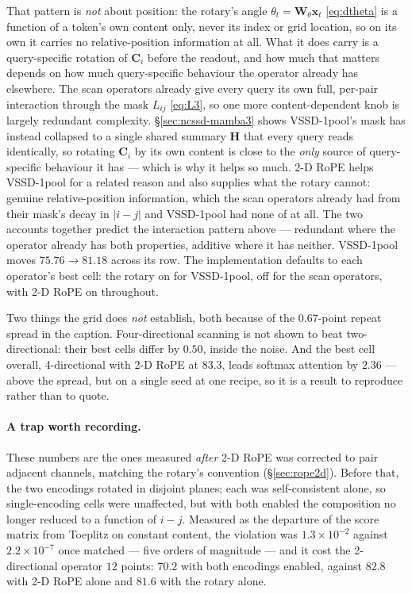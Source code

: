 \documentclass[11pt,a4paper]{article}
\begin{document}
That pattern is \emph{not} about position: the rotary's angle
$\theta_t=\bm{W}_\theta\bm{x}_t$ \eqref{eq:dtheta} is a function of a token's own
content only, never its index or grid location, so on its own it carries no
relative-position information at all. What it does carry is a query-specific rotation
of $\bm{C}_i$ before the readout, and how much that matters depends on how much
query-specific behaviour the operator already has elsewhere. The scan operators already
give every query its own full, per-pair interaction through the mask $L_{ij}$
\eqref{eq:L3}, so one more content-dependent knob is largely redundant complexity.
\S\ref{sec:ncssd-mamba3} shows VSSD-1pool's mask has instead collapsed to a single
shared summary $\bm{H}$ that every query reads identically, so rotating $\bm{C}_i$ by
its own content is close to the \emph{only} source of query-specific behaviour it has
--- which is why it helps so much. 2-D RoPE helps VSSD-1pool for a related reason and
also supplies what the rotary cannot: genuine relative-position information, which the
scan operators already had from their mask's decay in $|i-j|$ and VSSD-1pool had
none of at all. The two accounts together predict the interaction pattern above ---
redundant where the operator already has both properties, additive where it has
neither. VSSD-1pool moves $75.76 \to 81.18$ across its row. The implementation
defaults to each operator's best cell: the rotary on for VSSD-1pool, off for the
scan operators, with 2-D RoPE on throughout.

Two things the grid does \emph{not} establish, both because of the $0.67$-point
repeat spread in the caption. Four-directional scanning is not shown to beat
two-directional: their best cells differ by $0.50$, inside the noise. And the
best cell overall, 4-directional with 2-D RoPE at $83.3$, leads softmax
attention by $2.36$ --- above the spread, but on a single seed at one recipe, so
it is a result to reproduce rather than to quote.

\paragraph{A trap worth recording.}
These numbers are the ones measured \emph{after} 2-D RoPE was corrected to pair
adjacent channels, matching the rotary's convention (\S\ref{sec:rope2d}). Before
that, the two encodings rotated in disjoint planes; each was self-consistent
alone, so single-encoding cells were unaffected, but with both enabled the
composition no longer reduced to a function of $i-j$. Measured as the departure of
the score matrix from Toeplitz on constant content, the violation was
$1.3\times10^{-2}$ against $2.2\times10^{-7}$ once matched --- five orders of
magnitude --- and it cost the 2-directional operator $12$ points: $70.2$ with both
encodings enabled, against $82.8$ with 2-D RoPE alone and $81.6$ with the rotary
alone.
\end{document}
